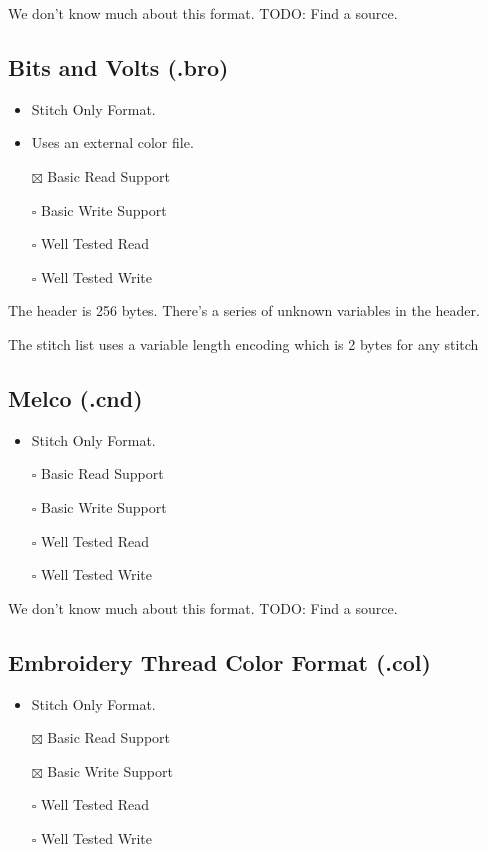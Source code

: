 \documentclass[onesize, a4paper]{refart}
\providecommand{\tightlist}{\setlength{\itemsep}{0pt}\setlength{\parskip}{0pt}}
\begin{document}
We don't know much about this format. TODO: Find a source.

\subsection{Bits and Volts (.bro)}

\begin{itemize}
\tightlist
\item Stitch Only Format.
\item Uses an external color file.
\item[$\boxtimes$] Basic Read Support
\item[$\square$] Basic Write Support
\item[$\square$] Well Tested Read
\item[$\square$] Well Tested Write
\end{itemize}

The header is 256 bytes. There's a series of unknown variables in the
header.

The stitch list uses a variable length encoding which is 2 bytes for any
stitch

\subsection{Melco (.cnd)}

\begin{itemize}
\tightlist
\item Stitch Only Format.
\item[$\square$] Basic Read Support
\item[$\square$] Basic Write Support
\item[$\square$] Well Tested Read
\item[$\square$] Well Tested Write
\end{itemize}

We don't know much about this format. TODO: Find a source.

\subsection{Embroidery Thread Color Format (.col)}

\begin{itemize}
\tightlist
\item Stitch Only Format.
\item[$\boxtimes$] Basic Read Support
\item[$\boxtimes$] Basic Write Support
\item[$\square$] Well Tested Read
\item[$\square$] Well Tested Write
\end{itemize}
\end{document}
